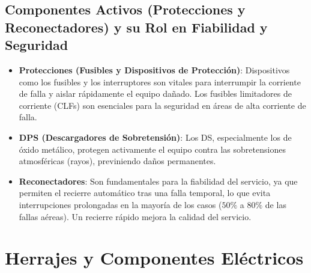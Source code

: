 \subsection*{Componentes Activos (Protecciones y Reconectadores) y su Rol en Fiabilidad y Seguridad}
\begin{itemize}
    \item \textbf{Protecciones (Fusibles y Dispositivos de Protección)}: Dispositivos como los fusibles y los interruptores son vitales para interrumpir la corriente de falla y aislar rápidamente el equipo dañado. Los fusibles limitadores de corriente (CLFs) son esenciales para la seguridad en áreas de alta corriente de falla.
    \item \textbf{DPS (Descargadores de Sobretensión)}: Los DS, especialmente los de óxido metálico, protegen activamente el equipo contra las sobretensiones atmosféricas (rayos), previniendo daños permanentes.
    \item \textbf{Reconectadores}: Son fundamentales para la fiabilidad del servicio, ya que permiten el recierre automático tras una falla temporal, lo que evita interrupciones prolongadas en la mayoría de los casos ($50\%$ a $80\%$ de las fallas aéreas). Un recierre rápido mejora la calidad del servicio.
\end{itemize}


\section*{Herrajes y Componentes Eléctricos}


